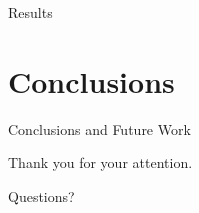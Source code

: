 \documentclass[aspectratio=169]{beamer}
\begin{document}
\begin{frame}{Results}

\end{frame}

\section{Conclusions}

\begin{frame}{Conclusions and Future Work}

\end{frame}

\begin{frame}
    \centering
    \Large Thank you for your attention.

    \vspace{1em}
    \normalsize Questions?
\end{frame}
\end{document}
